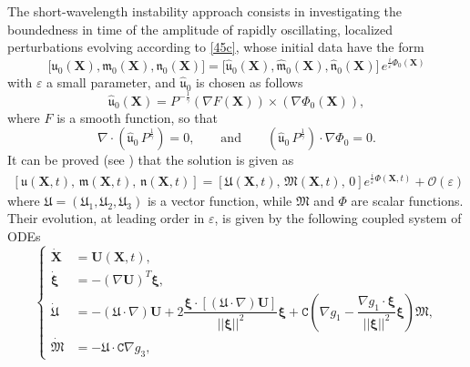 \documentclass[reqno]{amsart}
\newcommand{\uu}{\boldsymbol{\mathfrak{u}}}             %
\newcommand{\m}{\mathfrak{m}}
\newcommand{\nn}{\mathfrak{n}}
\newcommand{\cs}{\texttt{C}}
\newcommand{\A}{\boldsymbol{\mathfrak{U}}}              %
\newcommand{\B}{{\mathfrak{M}}}
\newcommand{\x}{\mathbf{X}}              %
\newcommand{\bu}{\mathbf{U}}             %
\newcommand{\e}{{\varepsilon}}
\begin{document}
\noindent
The short-wavelength instability approach consists in investigating the boundedness in time of the amplitude of rapidly oscillating, localized perturbations evolving according to \eqref{45c}, whose initial data have the form
\begin{equation}
    \bigl[\uu_0(\x), \m_0(\x), \nn_0(\x)\bigr]= \bigl[\hat{\uu}_0(\x), \hat{\m}_0(\x), \hat{\nn}_0(\x)\bigr]\, e^{{\frac{i }{\e}\Phi_0(\x)}}
\end{equation}
with $\e$ a small parameter, and $\hat{\uu}_0$ is chosen as follows
\begin{equation}
    \hat{\uu}_0(\x)=P^{-\frac{1}{\gamma}}\left(\nabla F(\x)\right)\times \left(\nabla \Phi_0(\x)\right),
\end{equation}
where $F$ is a smooth function, so that 
\begin{equation}
    \nabla\cdot \left(\hat{\uu}_0\,P^{\frac{1}{\gamma}}\right)=0, \qquad\text{and}\qquad \left(\hat{\uu}_0 \,P^{\frac{1}{\gamma}}\right)\cdot\nabla\Phi_0=0.
\end{equation}
It can be proved (see \cite{LebovitzL}) that the solution is given as 
\begin{equation}\label{up}
    \begin{aligned}
      \left[  \boldsymbol{\mathfrak{u}}(\x,t),\, \m(\x,t),\, \nn(\x,t)\right]=\left[\A(\x,t),\, \B(\x,t),\,0\right] e^{\frac{i}{\e}\Phi(\x,t)}+\mathcal{O}(\e)
    \end{aligned}
\end{equation}
where $\A=(\mathfrak{U}_1, \mathfrak{U}_2, \mathfrak{U}_3)$ is a vector function, while $\B$ and $\Phi$ are scalar functions. Their evolution, at leading order in $\e$, is given by the following coupled system of ODEs 
  \begin{equation}\label{leading order}
   \left \{\begin{aligned}
    \dot{\x}&=\bu(\x,t),\\
     \dot{\boldsymbol{\xi}}& =-(\nabla\bu)^T\boldsymbol{\xi}, \\  
    \dot{\A}&=-(\A\cdot\nabla)\bu+2\dfrac{\boldsymbol{\xi}\cdot[(\A\cdot\nabla)\bu]}{||\boldsymbol{\xi}||^2}\boldsymbol{\xi}+\cs\left(\nabla g_1-\dfrac{\nabla g_1\cdot\boldsymbol{\xi}}{||\boldsymbol{\xi}||^2}\boldsymbol{\xi}\right)\B, \\
       \dot{\B}&=-\A\cdot\cs \nabla g_3 ,
       \end{aligned} \right.
\end{equation}
\end{document}
